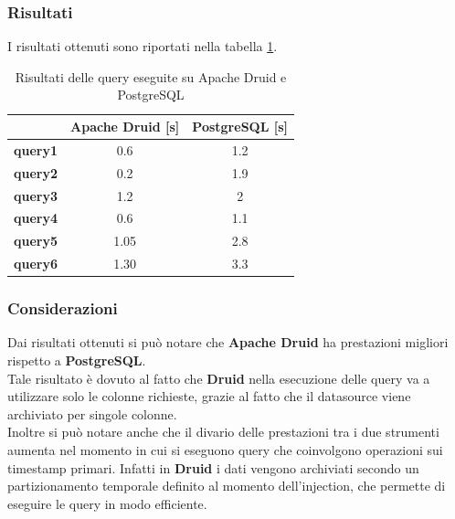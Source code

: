 \subsubsection{Risultati}
I risultati ottenuti sono riportati nella tabella \ref{tab:risultati_query}.
\begin{table}[h]
  \centering
  \caption{Risultati delle query eseguite su Apache Druid e PostgreSQL}
  \label{tab:risultati_query}
  \begin{tabular}{|c|c|c|}


\hline
& \textbf{Apache Druid [s]} &  \textbf{PostgreSQL [s]} \\\hline 

\textbf{query1} &    0.6 &  1.2 \\ \hline

\textbf{query2} &   0.2 &   1.9 \\ \hline 

\textbf{query3} &  1.2 &  2 \\ \hline
\textbf{query4} &  0.6 &  1.1 \\ \hline
\textbf{query5} &   1.05 &  2.8 \\ \hline
\textbf{query6} & 1.30 &  3.3 \\ \hline    
  \end{tabular}
\end{table}
\subsubsection{Considerazioni}
Dai risultati ottenuti si può notare che \textbf{Apache Druid} ha prestazioni migliori rispetto a \textbf{PostgreSQL}.\\
Tale risultato è dovuto al fatto che \textbf{Druid} nella esecuzione delle query va a utilizzare solo le colonne richieste, grazie al fatto che 
il \gls{datasource}{} viene archiviato per singole colonne.\\
Inoltre si può notare anche che il divario delle prestazioni tra i due strumenti aumenta nel momento 
in cui si eseguono query che coinvolgono operazioni sui timestamp primari.
Infatti in \textbf{Druid} i dati vengono archiviati secondo un partizionamento temporale definito 
al momento dell'\gls{injection}{}, che permette di eseguire le query in modo efficiente.
\pagebreak
